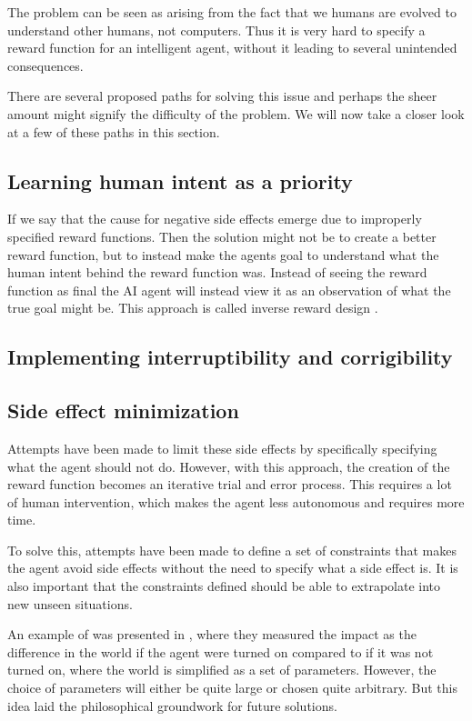\documentclass[12pt,A4]{report}
\theoremstyle{definition}
\begin{document}
The problem can be seen as arising from the fact that we humans are evolved to understand other humans, not computers. Thus it is very hard to specify a reward function for an intelligent agent, without it leading to several unintended consequences. 

There are several proposed paths for solving this issue and perhaps the sheer amount might signify the difficulty of the problem. We will now take a closer look at a few of these paths in this section.

\subsection{Learning human intent as a priority}
If we say that the cause for negative side effects emerge due to improperly specified reward functions. Then the solution might not be to create a better reward function, but to instead make the agents goal to understand what the human intent behind the reward function was. Instead of seeing the reward function as final the AI agent will instead view it as an observation of what the true goal might be. This approach is called inverse reward design \autocite{Hadfield-Mennell et. al}.


\subsection{Implementing interruptibility and corrigibility}


\subsection{Side effect minimization}
Attempts have been made to limit these side effects by specifically specifying what the agent should not do\autocite{Zhang et al}. However, with this approach, the creation of the reward function becomes an iterative trial and error process. This requires a lot of human intervention, which makes the agent less autonomous and requires more time. 

To solve this, attempts have been made to define a set of constraints that makes the agent avoid side effects without the need to specify what a side effect is. It is also important that the constraints defined should be able to extrapolate into new unseen situations.

An example of was presented in \autocite{Armstrong and Levinstein}, where they measured the impact as the difference in the world if the agent were turned on compared to if it was not turned on, where the world is simplified as a set of parameters. However, the choice of parameters will either be quite large or chosen quite arbitrary. But this idea laid the philosophical groundwork for future solutions.
\end{document}
